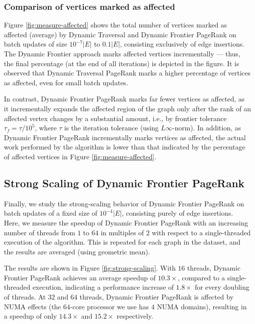 \subsubsection{Comparison of vertices marked as affected}

Figure \ref{fig:measure-affected} shows the total number of vertices marked as affected (average) by Dynamic Traversal and Dynamic Frontier PageRank on batch updates of size $10^{-7}|E|$ to $0.1|E|$, consisting exclusively of edge insertions. The Dynamic Frontier approach marks affected vertices incrementally --- thus, the final percentage (at the end of all iterations) is depicted in the figure. It is observed that Dynamic Traversal PageRank marks a higher percentage of vertices as affected, even for small batch updates. In contrast, Dynamic Frontier PageRank marks far fewer vertices as affected, as it incrementally expands the affected region of the graph only after the rank of an affected vertex changes by a substantial amount, i.e., by frontier tolerance $\tau_f = \tau / 10^5$, where $\tau$ is the iteration tolerance (using $L\infty$-norm). In addition, as Dynamic Frontier PageRank incrementally marks vertices as affected, the actual work performed by the algorithm is lower than that indicated by the percentage of affected vertices in Figure \ref{fig:measure-affected}.






\subsection{Strong Scaling of Dynamic Frontier PageRank}

Finally, we study the strong-scaling behavior of Dynamic Frontier PageRank on batch updates of a fixed size of $10^{-4} |E|$, consisting purely of edge insertions. Here, we measure the speedup of Dynamic Frontier PageRank with an increasing number of threads from $1$ to $64$ in multiples of $2$ with respect to a single-threaded execution of the algorithm. This is repeated for each graph in the dataset, and the results are averaged (using geometric mean).

The results are shown in Figure \ref{fig:strong-scaling}. With $16$ threads, Dynamic Frontier PageRank achieves an average speedup of $10.3\times$, compared to a single-threaded execution, indicating a performance increase of $1.8\times$ for every doubling of threads. At $32$ and $64$ threads, Dynamic Frontier PageRank is affected by NUMA effects (the $64$-core processor we use has $4$ NUMA domains), resulting in a speedup of only $14.3\times$ and $15.2\times$ respectively.

\ignore{}
